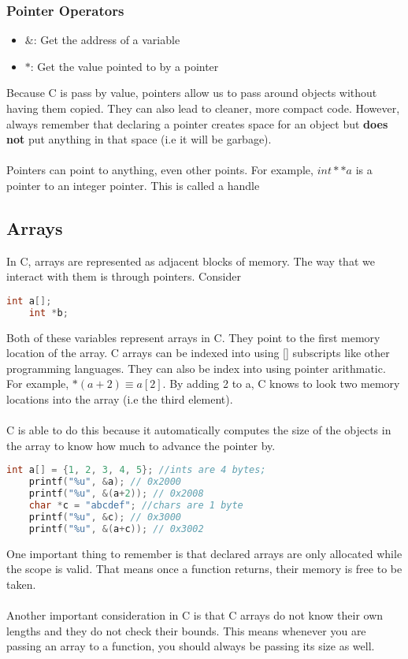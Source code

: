 \documentclass{article}
\begin{document}
\subsubsection{Pointer Operators}
\begin{itemize}
    \item $\&$: Get the address of a variable
    \item $*$: Get the value pointed to by a pointer
\end{itemize}
Because C is pass by value, pointers allow us to pass around objects without having them copied.
They can also lead to cleaner, more compact code. However, always remember that declaring a pointer
creates space for an object but \textbf{does not} put anything in that space (i.e it will be garbage).\\\\
Pointers can point to anything, even other points. For example, $int **a$ is a pointer to an integer pointer. 
This is called a handle
\subsection{Arrays}
In C, arrays are represented as adjacent blocks of memory. The way that we interact with them is through pointers.
Consider
\begin{lstlisting}[language=C]
    int a[];
    int *b;
\end{lstlisting}
Both of these variables represent arrays in C. They point to the first memory location of the array.
C arrays can be indexed into using [] subscripts like other programming languages. They can also be
index into using pointer arithmatic. For example, $*(a+2) \equiv a[2]$. By adding 2 to a, C knows to 
look two memory locations into the array (i.e the third element).\\\\
C is able to do this because it automatically computes the size of the objects in the array to know how
much to advance the pointer by.
\begin{lstlisting}[language=C]
    int a[] = {1, 2, 3, 4, 5}; //ints are 4 bytes;
    printf("%u", &a); // 0x2000
    printf("%u", &(a+2)); // 0x2008
    char *c = "abcdef"; //chars are 1 byte
    printf("%u", &c); // 0x3000
    printf("%u", &(a+c)); // 0x3002
\end{lstlisting}
One important thing to remember is that declared arrays are only allocated while the scope is valid.
That means once a function returns, their memory is free to be taken.\\\\
Another important consideration in C is that C arrays do not know their own lengths and they do not check their bounds.
This means whenever you are passing an array to a function, you should always be passing its size as well.
\end{document}
